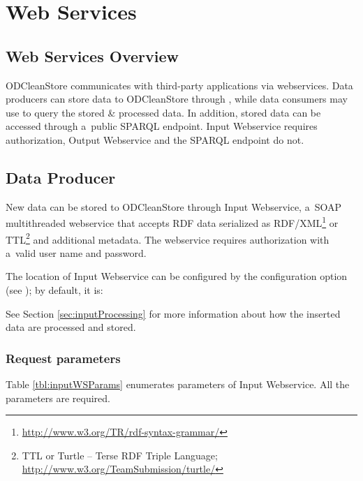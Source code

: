 
\chapter{Web Services}
\section{Web Services Overview}
ODCleanStore communicates with third-party applications via webservices. Data producers can store data to ODCleanStore through , while data consumers may use  to query the stored \& processed data. In addition, stored data can be accessed through a~public SPARQL endpoint. Input Webservice requires authorization, Output Webservice and the SPARQL endpoint do not.

\section{Data Producer}
\label{sec:inputWS}

New data can be stored to ODCleanStore through Input Webservice, a~SOAP multithreaded webservice that accepts RDF data serialized as RDF/XML\footnote{\url{http://www.w3.org/TR/rdf-syntax-grammar/}} or TTL\footnote{TTL or Turtle -- Terse RDF Triple Language; \url{http://www.w3.org/TeamSubmission/turtle/}} and additional metadata. The webservice requires authorization with a~valid user name and password.

The location of Input Webservice can be configured by the  configuration option (see ); by default, it is:
\begin{center}
\end{center}

See Section \ref{sec:inputProcessing} for more information about how the inserted data are processed and stored.

\subsection{Request parameters}
\label{sec:inputWSParams}

Table \ref{tbl:inputWSParams} enumerates parameters of Input Webservice. All the parameters are required.

